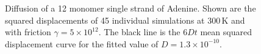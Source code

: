 \begin{figure}[htb]
       \begin{center}
               \scalebox{0.9}{
                        \nonstopmode
                        
                        \errorstopmode
                        \rule[-0.5cm]{0cm}{0cm}}
                \caption{Diffusion of a 12 monomer single strand of Adenine. Shown are the squared displacements of 45 individual simulations at 300\,K and with friction $\gamma = 5 \times 10^{12}$. The black line is the $6Dt$ mean squared displacement curve for the fitted value of $D = 1.3 \times 10^{-10}$.}
        \end{center}
\end{figure}

